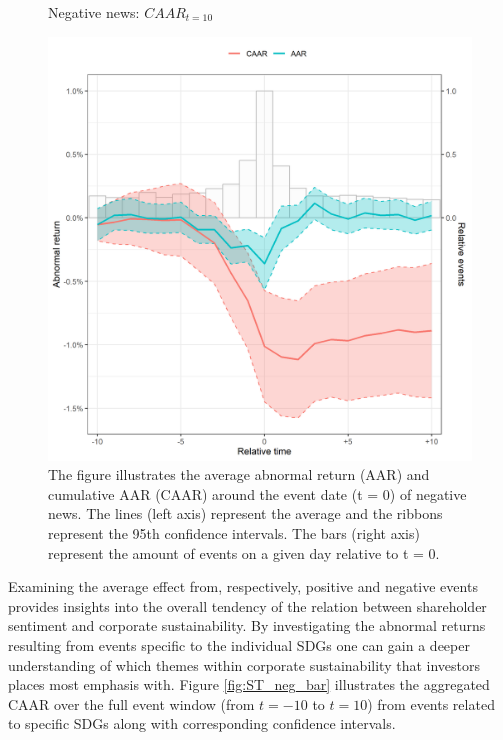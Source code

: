 \begin{figure} [H]
    \centering
    \caption{Negative news: $CAAR_{t=10}$}
    \includegraphics[scale=0.6]{Projekt/1.Figures analysis/ST_negative_all_CI.png}
     \caption*{\footnotesize The figure illustrates the average abnormal return (AAR) and cumulative AAR (CAAR) around the event date (t = 0) of negative news. The lines (left axis) represent the average and the ribbons represent the 95th confidence intervals. The bars (right axis) represent the amount of events on a given day relative to t = 0. }
    \label{fig:ST_neg_news}
\end{figure} 

Examining the average effect from, respectively, positive and negative events provides insights into the overall tendency of the relation between shareholder sentiment and corporate sustainability. By investigating the abnormal returns resulting from events specific to the individual SDGs one can gain a deeper understanding of which themes within corporate sustainability that investors places most emphasis with. Figure \ref{fig:ST_neg_bar} illustrates the aggregated CAAR over the full event window (from $t=-10$ to $t=10$) from events related to specific SDGs along with corresponding confidence intervals. 

